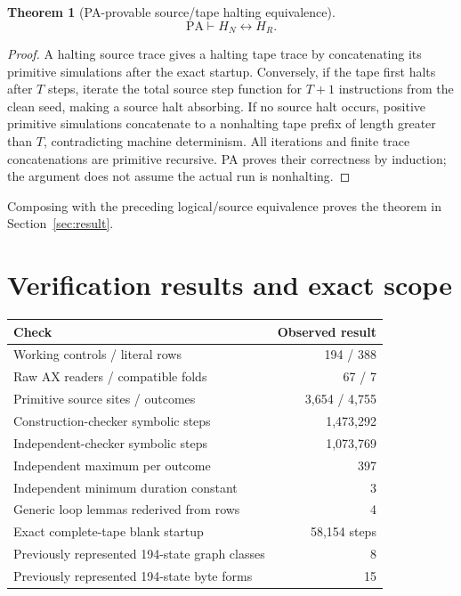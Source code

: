\documentclass[11pt,letterpaper]{article}
\newcommand{\PA}{\mathrm{PA}}
\newtheorem{theorem}{Theorem}[section]
\begin{document}
\begin{theorem}[PA-provable source/tape halting equivalence]
\[
             \PA\vdash H_N\leftrightarrow H_R.
\]
\end{theorem}
\begin{proof}
A halting source trace gives a halting tape trace by concatenating its
primitive simulations after the exact startup. Conversely, if the tape
first halts after $T$ steps, iterate the total source step function for
$T+1$ instructions from the clean seed, making a source halt absorbing.
If no source halt occurs, positive primitive simulations concatenate to
a nonhalting tape prefix of length greater than $T$, contradicting
machine determinism. All iterations and finite trace concatenations are
primitive recursive. PA proves their correctness by induction; the
argument does not assume the actual run is nonhalting.
\end{proof}
Composing with the preceding logical/source equivalence proves the theorem
in Section~\ref{sec:result}.

\section{Verification results and exact scope}
\label{sec:verification}

\begin{center}
\begin{tabular}{@{}lr@{}}
\toprule
Check & Observed result\\
\midrule
Working controls / literal rows & 194 / 388\\
Raw AX readers / compatible folds & 67 / 7\\
Primitive source sites / outcomes & 3,654 / 4,755\\
Construction-checker symbolic steps & 1,473,292\\
Independent-checker symbolic steps & 1,073,769\\
Independent maximum per outcome & 397\\
Independent minimum duration constant & 3\\
Generic loop lemmas rederived from rows & 4\\
Exact complete-tape blank startup & 58,154 steps\\
Previously represented 194-state graph classes & 8\\
Previously represented 194-state byte forms & 15\\
\bottomrule
\end{tabular}
\end{center}
\end{document}
